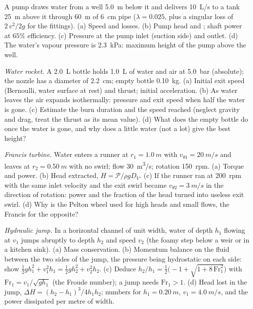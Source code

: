 \begin{exercise}[$\star\star$]\label{exo:b2:flow-balances:9}
A pump draws water from a well \qty{5.0}{m} below it and delivers
\qty{10}{L/s} to a tank \qty{25}{m} above it through \qty{60}{m} of \qty{6}{cm}
pipe ($\lambda = 0.025$, plus a singular loss of $2\,v^2/2g$ for the fittings).
(a) Speed and losses. (b) Pump head and ; shaft power
at $65\%$ efficiency. (c) Pressure at the pump inlet (suction side) and
outlet. (d) The water's vapour pressure is \qty{2.3}{kPa}: maximum height
of the pump above the well.
\end{exercise}

\begin{exercise}[$\star\star\star$]\label{exo:b2:flow-balances:10}
\emph{Water rocket.} A \qty{2.0}{L} bottle holds \qty{1.0}{L} of water and
air at \qty{5.0}{bar} (absolute); the nozzle has a diameter of \qty{2.2}{cm};
empty bottle \qty{0.10}{kg}. (a) Initial exit speed (Bernoulli, water
surface at rest) and thrust; initial acceleration. (b) As water leaves
the air expands isothermally: pressure and exit speed when half the
water is gone. (c) Estimate the burn duration and the speed reached
(neglect gravity and drag, treat the thrust as its mean value). (d)
What does the empty bottle do once the water is gone, and why does a
little water (not a lot) give the best height?
\end{exercise}

\begin{exercise}[$\star\star\star$]\label{exo:b2:flow-balances:11}
\emph{Francis turbine.} Water enters a runner at $r_1 = \qty{1.0}{m}$ with
$v_{\theta1} = \qty{20}{m/s}$ and leaves at $r_2 = \qty{0.50}{m}$ with no swirl;
flow \qty{30}{m^3/s}; rotation \qty{150}{rpm}. (a) Torque and power. (b)
Head extracted, $H = \mathcal P/\rho gD_V$. (c) If the runner ran at
\qty{200}{rpm} with the same inlet velocity and the exit swirl became
$v_{\theta2} = \qty{3}{m/s}$ in the direction of rotation: power and the
fraction of the head turned into useless exit swirl. (d) Why is the
Pelton wheel used for high heads and small flows, the Francis for the
opposite?
\end{exercise}

\begin{exercise}[$\star\star\star$]\label{exo:b2:flow-balances:12}
\emph{Hydraulic jump.} In a horizontal channel of unit width, water
of depth $h_1$ flowing at $v_1$ jumps abruptly to depth $h_2$ and speed
$v_2$ (the foamy step below a weir or in a kitchen sink). (a) Mass
conservation. (b) Momentum balance on the fluid between the two sides
of the jump, the pressure being hydrostatic on each side: show
$\tfrac12gh_1^2 + v_1^2h_1 = \tfrac12gh_2^2 + v_2^2h_2$. (c) Deduce $h_2/h_1 =
\tfrac12\bigl(-1 + \sqrt{1 + 8\,\mathrm{Fr}_1^2}\bigr)$ with $\mathrm{Fr}_1 =
v_1/\sqrt{gh_1}$ (the Froude number); a jump needs $\mathrm{Fr}_1 > 1$. (d)
Head lost in the jump, $\Delta H = (h_2 - h_1)^3/4h_1h_2$; numbers for $h_1 =
\qty{0.20}{m}$, $v_1 = \qty{4.0}{m/s}$, and the power dissipated per metre
of width.
\end{exercise}

